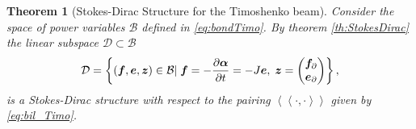 \documentclass[11t]{article}
\newtheorem{theorem}{Theorem}
\begin{document}
{\begin{theorem}[Stokes-Dirac Structure for the Timoshenko beam]
			Consider the space of power variables $\mathcal{B}$ defined in \eqref{eq:bondTimo}. By theorem \ref{th:StokesDirac} the linear subspace $\mathcal{D} \subset \mathcal{B}$
			\begin{equation}
			\mathcal{D} =  \left\{(\bm{f}, \bm{e},\bm{z}) \in \mathcal{B} | \; \bm{f} = - \diffp{\bm{\alpha}}{t} = -J\bm{e}, \; \bm{z} = \begin{pmatrix} \bm{f}_{\partial} \\ \bm{e}_{\partial} \end{pmatrix} 
			\right\},
			\end{equation}
			is a Stokes-Dirac structure with respect to the pairing $\left\langle \left\langle \cdot, \cdot \right\rangle \right\rangle$ given by \eqref{eq:bil_Timo}.
		\end{theorem}
	}
	
\end{document}
